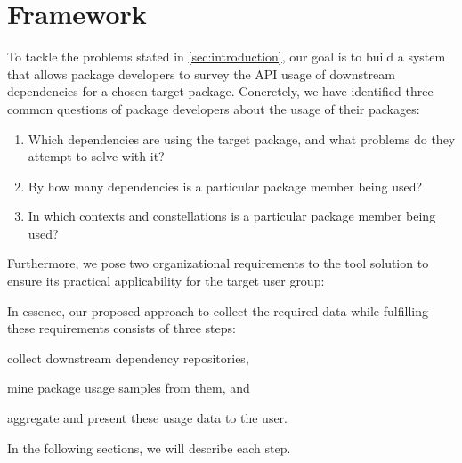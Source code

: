 \section{Framework}
\label{sec:framework}

To tackle the problems stated in \cref{sec:introduction}, our goal is to build a system that allows package developers to survey the API usage of downstream dependencies for a chosen target package.
Concretely, we have identified three common questions of package developers about the usage of their packages:

\begin{enumerate}[label=Q\arabic*]
	\item Which dependencies are using the target package, and what problems do they attempt to solve with it?
	\item By how many dependencies is a particular package member being used?
	\item In which contexts and constellations is a particular package member being used?
\end{enumerate}

Furthermore, we pose two organizational requirements to the tool solution to ensure its practical applicability for the target user group:


In essence, our proposed approach to collect the required data while fulfilling these requirements consists of three steps:
\begin{enumerate*}[label=(\roman*)]
	\item collect downstream dependency repositories,
	\item mine package usage samples from them,
	and \item aggregate and present these usage data to the user.
\end{enumerate*}
In the following sections, we will describe each step.
